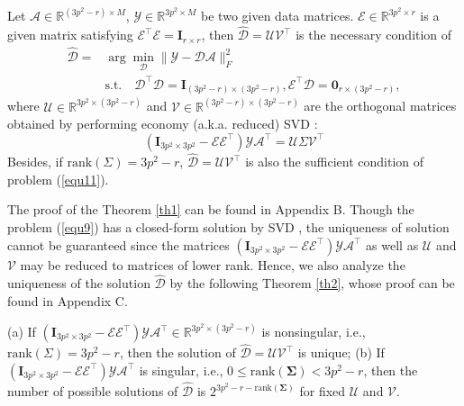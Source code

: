 \begin{theorem}
\label{th1}
Let $\mathcal{A}\in \mathbb{R}^{(3p^2-r)\times M}$, $\mathcal{Y}\in \mathbb{R}^{3p^2\times M}$ be two given data matrices. $\mathcal{E}\in\mathbb{R}^{3p^2\times r}$ is a given matrix satisfying $\mathcal{E}^{\top}\mathcal{E}=\bm{I}_{r\times r}$, then $\hat{\mathcal{D}} = \mathcal{U}\mathcal{V}^{\top}$ is the necessary condition of
\begin{equation}\label{equ11}
\begin{split}
\hat{\mathcal{D}}
=
&
\arg\min_{\mathcal{D}}\|\mathcal{Y}-\mathcal{D}\mathcal{A}\|_{F}^{2}
\quad
\\
&
\text{s.t.}
\quad
\mathcal{D}^{\top}\mathcal{D} = \bm{I}_{(3p^2-r)\times (3p^2-r)}, \mathcal{E}^{\top}\mathcal{D} = \bm{0}_{r\times (3p^2-r)}
,
\end{split}
\end{equation}
where $\mathcal{U}\in \mathbb{R}^{3p^2\times (3p^2-r)}$ and $\mathcal{V}\in \mathbb{R}^{(3p^2-r)\times (3p^2-r)}$ are the orthogonal matrices obtained by performing economy (a.k.a. reduced) SVD  \cite{eckart1936approximation}:
\begin{equation}\label{equ12}
(\bm{I}_{3p^2\times 3p^2}-\mathcal{E}\mathcal{E}^{\top})\mathcal{Y}\mathcal{A}^{\top} = \mathcal{U}\Sigma\mathcal{V}^{\top}
\end{equation}
Besides, if $\text{rank}(\Sigma)=3p^2-r$, $\hat{\mathcal{D}} = \mathcal{U}\mathcal{V}^{\top}$ is also the sufficient condition of problem (\ref{equ11}). 
\end{theorem}


The proof of the Theorem \ref{th1} can be found in Appendix B. Though the problem (\ref{equ9}) has a closed-form solution by SVD \cite{eckart1936approximation}, the uniqueness of solution cannot be guaranteed since the matrices $(\bm{I}_{3p^2\times 3p^2}-\mathcal{E}\mathcal{E}^{\top})\mathcal{Y}\mathcal{A}^{\top}$ as well as $\mathcal{U}$ and $\mathcal{V}$ may be reduced to matrices of lower rank. Hence, we also analyze the uniqueness of the solution $\hat{\mathcal{D}}$ by the following Theorem \ref{th2}, whose proof can be found in Appendix C.

\begin{theorem}
\label{th2}
(a) If $(\bm{I}_{3p^2\times 3p^2}-\mathcal{E}\mathcal{E}^{\top})\mathcal{Y}\mathcal{A}^{\top}\in\mathbb{R}^{3p^2\times (3p^2-r)}$ is nonsingular, i.e., $\text{rank}(\Sigma)=3p^2-r$, then the solution of $\hat{\mathcal{D}}=\mathcal{U}\mathcal{V}^{\top}$ is unique; (b) If $(\bm{I}_{3p^2\times 3p^2}-\mathcal{E}\mathcal{E}^{\top})\mathcal{Y}\mathcal{A}^{\top}$ is singular, i.e., $0\le\text{rank}(\bm{\Sigma})< 3p^2-r$, then the number of possible solutions of $\hat{\mathcal{D}}$ is $2^{3p^2-r-\text{rank}(\bm{\Sigma})}$ for fixed $\mathcal{U}$ and $\mathcal{V}$.
\end{theorem}


